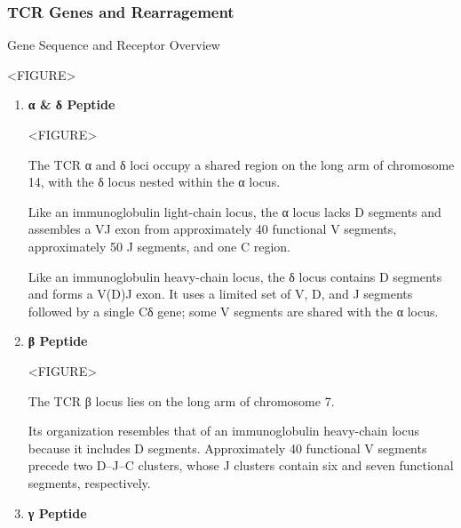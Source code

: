     \subsubsection{TCR Genes and Rearragement}

      \begin{core}{Gene Sequence and Receptor Overview}

        <FIGURE>

        \begin{enumerate}

          \item \textbf{α \& δ Peptide} 

            <FIGURE>

            The TCR α and δ loci occupy a shared region on the long arm of chromosome 14, with the δ locus nested within the α locus.

            Like an immunoglobulin light-chain locus, the α locus lacks D segments and assembles a VJ exon from approximately 40 functional V segments, approximately 50 J segments, and one C region.

            Like an immunoglobulin heavy-chain locus, the δ locus contains D segments and forms a V(D)J exon. It uses a limited set of V, D, and J segments followed by a single Cδ gene; some V segments are shared with the α locus.

          \item \textbf{β Peptide}

            <FIGURE>

            The TCR β locus lies on the long arm of chromosome 7.

            Its organization resembles that of an immunoglobulin heavy-chain locus because it includes D segments. Approximately 40 functional V segments precede two D--J--C clusters, whose J clusters contain six and seven functional segments, respectively.

          \item \textbf{γ Peptide}


\end{enumerate}
\end{core}
